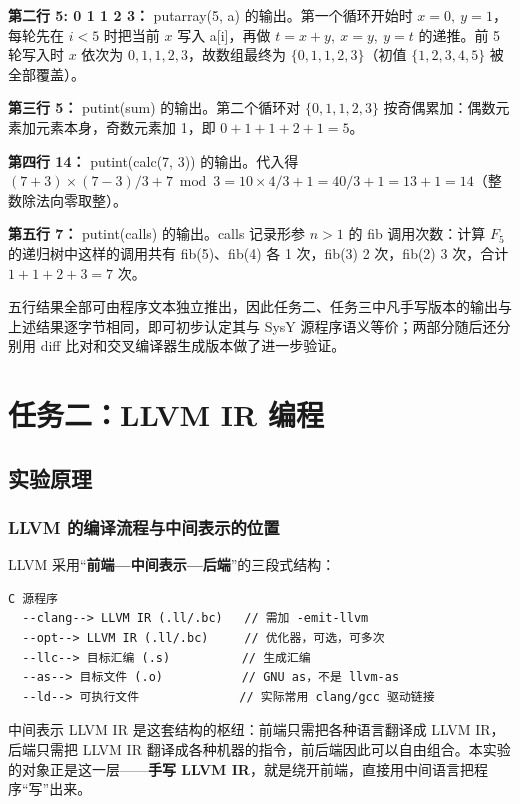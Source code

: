 \documentclass[UTF8,a4paper,10pt]{ctexart}
\begin{document}
\noindent\textbf{第二行 5: 0 1 1 2 3：} putarray(5, a) 的输出。第一个循环开始时 $x=0,\ y=1$，每轮先在 $i<5$ 时把当前 $x$ 写入 a[i]，再做 $t=x+y,\ x=y,\ y=t$ 的递推。前 5 轮写入时 $x$ 依次为 $0,1,1,2,3$，故数组最终为 $\{0,1,1,2,3\}$（初值 $\{1,2,3,4,5\}$ 被全部覆盖）。

\noindent\textbf{第三行 5：} putint(sum) 的输出。第二个循环对 $\{0,1,1,2,3\}$ 按奇偶累加：偶数元素加元素本身，奇数元素加 1，即 $0+1+1+2+1=5$。

\noindent\textbf{第四行 14：} putint(calc(7, 3)) 的输出。代入得 $(7+3)\times(7-3)/3+7\bmod 3 = 10\times4/3+1 = 40/3+1 = 13+1 = 14$（整数除法向零取整）。

\noindent\textbf{第五行 7：} putint(calls) 的输出。calls 记录形参 $n>1$ 的 fib 调用次数：计算 $F_5$ 的递归树中这样的调用共有 fib(5)、fib(4) 各 1 次，fib(3) 2 次，fib(2) 3 次，合计 $1+1+2+3=7$ 次。

五行结果全部可由程序文本独立推出，因此任务二、任务三中凡手写版本的输出与上述结果逐字节相同，即可初步认定其与 SysY 源程序语义等价；两部分随后还分别用 diff 比对和交叉编译器生成版本做了进一步验证。

\section{任务二：LLVM IR 编程}

\subsection{实验原理}

\subsubsection{LLVM 的编译流程与中间表示的位置}

LLVM 采用“\textbf{前端—中间表示—后端}”的三段式结构：

\begin{lstlisting}
C 源程序
  --clang--> LLVM IR (.ll/.bc)   // 需加 -emit-llvm
  --opt--> LLVM IR (.ll/.bc)     // 优化器，可选，可多次
  --llc--> 目标汇编 (.s)          // 生成汇编
  --as--> 目标文件 (.o)           // GNU as，不是 llvm-as
  --ld--> 可执行文件              // 实际常用 clang/gcc 驱动链接
\end{lstlisting}

中间表示 LLVM IR 是这套结构的枢纽：前端只需把各种语言翻译成 LLVM IR，后端只需把 LLVM IR 翻译成各种机器的指令，前后端因此可以自由组合。本实验的对象正是这一层——\textbf{手写 LLVM IR}，就是绕开前端，直接用中间语言把程序“写”出来。
\end{document}
